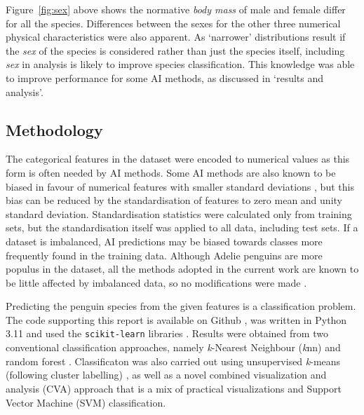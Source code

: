 \documentclass[a4paper, 11pt]{article}
\begin{document}
Figure~\ref{fig:sex} above shows the normative \textit{body mass} of male and female differ for all the species. 
Differences between the sexes for the other three numerical physical characteristics were also apparent. 
As `narrower' distributions result if the \textit{sex} of the species is considered 
rather than just the species itself, including \textit{sex} in analysis is likely to improve species classification. 
This knowledge was able to improve performance for some AI methods, as discussed in `results and analysis'.

\subsection*{Methodology}

The categorical features in the dataset were encoded to numerical values as this form is often needed by AI methods. 
Some AI methods are also known to be biased in favour of numerical features 
with smaller standard deviations \cite{hastie2009elements}, but this bias can be reduced by the standardisation 
of features to zero mean and unity standard deviation. Standardisation statistics were calculated only from 
training sets, but the standardisation itself was applied to all data, including test sets. 
If a dataset is imbalanced, AI predictions may be biased towards classes more frequently found in the training data. 
Although Adelie penguins are more populus in the dataset, all the methods adopted in the current work are known to be little affected by 
imbalanced data, so no modifications were made \cite{he2009learning}.

Predicting the penguin species from the given features is a classification problem. 
The code supporting this report is available on Github \cite{TimAIRepo}, was written in Python 3.11 \cite{python311} 
and used the \texttt{scikit-learn} libraries \cite{scikit-learn}.
Results were obtained from two conventional classification approaches, 
namely \textit{k}-Nearest Neighbour (\textit{k}nn) \cite{bishop2006pattern} and random forest \cite{breiman2001random}.
Classificaton was also carried out using 
unsupervised \textit{k}-means (following cluster labelling) \cite{tan2005introduction}, 
as well as a novel combined visualization and analysis (CVA) approach that is a mix of 
practical visualizations and Support Vector Machine (SVM) classification.
\end{document}

